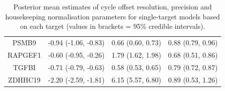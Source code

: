 \documentclass[../thesis.tex]{subfiles}
\begin{document}
\begin{table}[ht]
\begin{tabular}{cccc}
  PSMB9 & -0.94 (-1.06, -0.83) & 0.66 (0.60, 0.73) & 0.88 (0.79, 0.96) \\ 
  RAPGEF1 & -0.60 (-0.95, -0.26) & 1.79 (1.62, 1.98) & 0.68 (0.51, 0.86) \\ 
  TGFBI & -0.71 (-0.79, -0.63) & 0.58 (0.53, 0.65) & 0.79 (0.72, 0.87) \\ 
  ZDHHC19 & -2.20 (-2.59, -1.81) & 6.15 (5.57, 6.80) & 0.89 (0.53, 1.26) \\ 
   \hline
\end{tabular}
\caption{Posterior mean estimates of cycle offset resolution, precision and housekeeping normalisation parameters for single-target models based on each target (values in brackets = 95\% credible intervals). \label{tab:single_target_offset_models_summary}} 
\end{table}
\end{document}
